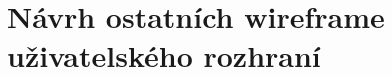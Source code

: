 






\chapter{Návrh ostatních wireframe uživatelského rozhraní}
\label{appendix:otherWireframes}

 \newpage

